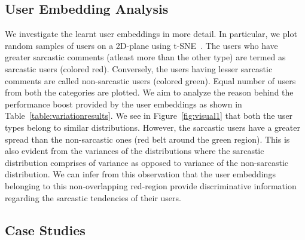 \documentclass[11pt]{article}
\begin{document}
{\subsection{User Embedding Analysis} \label{sec:visualization}


We investigate the learnt user embeddings in more detail. In particular, we plot random samples of users on a 2D-plane using t-SNE~\cite{maaten2008visualizing}. The users who have greater sarcastic comments (atleast  more than the other type) are termed as sarcastic users (colored red). Conversely, the users having lesser sarcastic comments are called non-sarcastic users (colored green). Equal number of users from both the categories are plotted. We aim to analyze the reason behind the performance boost provided by the user embeddings as shown in Table~\ref{table:variationresults}. We see in Figure~\ref{fig:visual1} that both the user types belong to similar distributions. However, the sarcastic users have a greater spread than the non-sarcastic ones (red belt around the green region). This is also evident from the variances of the distributions where the sarcastic distribution comprises of  variance as opposed to  variance of the non-sarcastic distribution. We can infer from this observation that the user embeddings belonging to this non-overlapping red-region provide discriminative information regarding the sarcastic tendencies of their users.

\subsection{Case Studies} \label{sec:casestudies}

}
\end{document}
